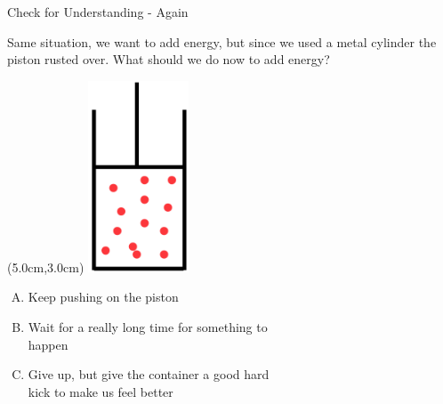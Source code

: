 \documentclass{beamer}
\newcommand{\red}[1]{{\color{red}{#1}}}
\newcommand{\checkl}[2]{\begin{textblock*}{1cm}(#1,#2){\large \red{\Checkmark}}\end{textblock*}}
\begin{document}
\begin{frame}[t]{Check for Understanding - Again}
\begin{center}
   Same situation, we want to add energy, but since we used a metal cylinder the piston rusted over. What should we do now to add energy?
   \begin{textblock*}{\textwidth}(5.0cm,3.0cm) %
      \includegraphics[width=3.0cm]{figures/mypiston.png}
   \end{textblock*}
   \begin{enumerate}[A.]
      \item Keep pushing on the piston
      \item Wait for a really long time for something to \\ happen
      \item Give up, but give the container a good hard \\ kick to make us feel better
   \end{enumerate}
\only<2>{\checkl{0.5cm}{4.1cm}}
\end{center}
\end{frame}
\end{document}
